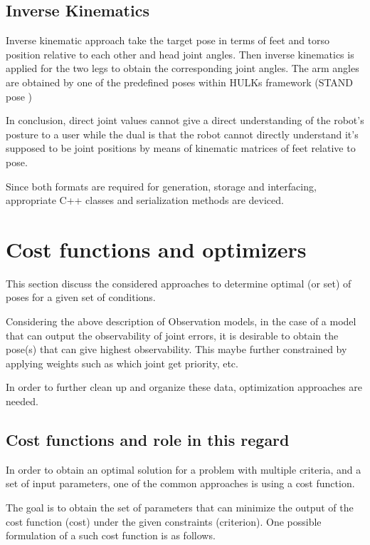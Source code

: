 \documentclass[english, printversion, nomenclature, notitle]{tuvisionthesis} %
\begin{document}
\subsection{Inverse Kinematics}

Inverse kinematic approach take the target pose in terms of feet and torso position relative to each other and head joint angles. Then inverse kinematics is applied for the two legs to obtain the corresponding joint angles. The arm angles are obtained by one of the predefined poses within HULKs framework (STAND pose )

In conclusion, direct joint values cannot give a direct understanding of the robot's posture to a user while the dual is that the robot cannot directly understand it's supposed to be joint positions by means of kinematic matrices of feet relative to pose. 

Since both formats are required for generation, storage and interfacing, appropriate C++ classes and serialization methods are deviced.


\section{Cost functions and optimizers}

This section discuss the considered approaches to determine optimal (or set) of poses for a given set of conditions.

Considering the above description of Observation models, in the case of a model that can output the observability of joint errors, it is desirable to obtain the pose(s) that can give highest observability. This maybe further constrained by applying weights such as which joint get priority, etc.

In order to further clean up and organize these data, optimization approaches are needed.

\subsection{Cost functions and role in this regard}

In order to obtain an optimal solution for a problem with multiple criteria, and a set of input parameters, one of the common approaches is using a cost function.

The goal is to obtain the set of parameters that can minimize the output of the cost function (cost) under the given constraints (criterion). One possible formulation of a such cost function is as follows.
\end{document}
